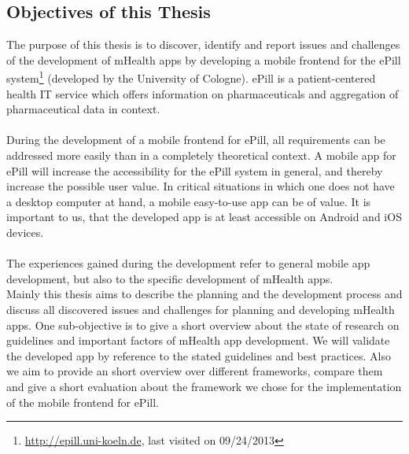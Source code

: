 \subsection{Objectives of this Thesis}
The purpose of this thesis is to discover, identify and report issues and challenges of the development of mHealth apps by developing a mobile frontend for the ePill system\footnote{\url{http://epill.uni-koeln.de}, last visited on 09/24/2013} (developed by the University of Cologne). ePill is a patient-centered health IT service which offers information on pharmaceuticals and aggregation of pharmaceutical data in context.
\\
\\
During the development of a mobile frontend for ePill, all requirements can be addressed more easily than in a completely theoretical context. A mobile app for ePill will increase the accessibility for the ePill system in general, and thereby increase the possible user value. In critical situations in which one does not have a desktop computer at hand, a mobile easy-to-use app can be of value. It is important to us, that the developed app is at least accessible on Android and iOS devices.
\\
\\
The experiences gained during the development refer to general mobile app development, but also to the specific development of mHealth apps.
\\
Mainly this thesis aims to describe the planning and the development process and discuss all discovered issues and challenges for planning and developing mHealth apps. One sub-objective is to give a short overview about the state of research on guidelines and important factors of mHealth app development. We will validate the developed app by reference to the stated guidelines and best practices. Also we aim to provide an short overview over different frameworks, compare them and give a short evaluation about the framework we chose for the implementation of the mobile frontend for ePill.